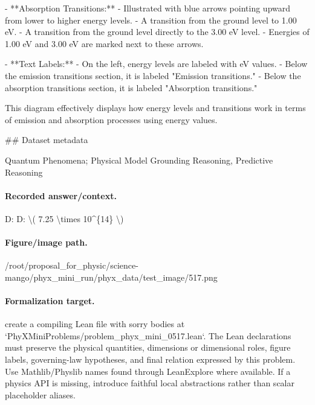   - **Absorption Transitions:**
    - Illustrated with blue arrows pointing upward from lower to higher energy levels.
    - A transition from the ground level to 1.00 eV.
    - A transition from the ground level directly to the 3.00 eV level.
    - Energies of 1.00 eV and 3.00 eV are marked next to these arrows.

- **Text Labels:**
  - On the left, energy levels are labeled with eV values.
  - Below the emission transitions section, it is labeled "Emission transitions."
  - Below the absorption transitions section, it is labeled "Absorption transitions."

This diagram effectively displays how energy levels and transitions work in terms of emission and absorption processes using energy values.

\#\# Dataset metadata

Quantum Phenomena; Physical Model Grounding Reasoning, Predictive Reasoning

\paragraph{Recorded answer/context.}
D: D: \textbackslash{}( 7.25 \textbackslash{}times 10\textasciicircum{}\{14\} \textbackslash{})

\paragraph{Figure/image path.}
/root/proposal\_for\_physic/science-mango/phyx\_mini\_run/phyx\_data/test\_image/517.png

\paragraph{Formalization target.}
create a compiling Lean file with sorry bodies at `PhyXMiniProblems/problem\_phyx\_mini\_0517.lean`. The Lean declarations must preserve the physical quantities, dimensions or dimensional roles, figure labels, governing-law hypotheses, and final relation expressed by this problem.
Use Mathlib/Physlib names found through LeanExplore where available. If a physics API is missing, introduce faithful local abstractions rather than scalar placeholder aliases.

